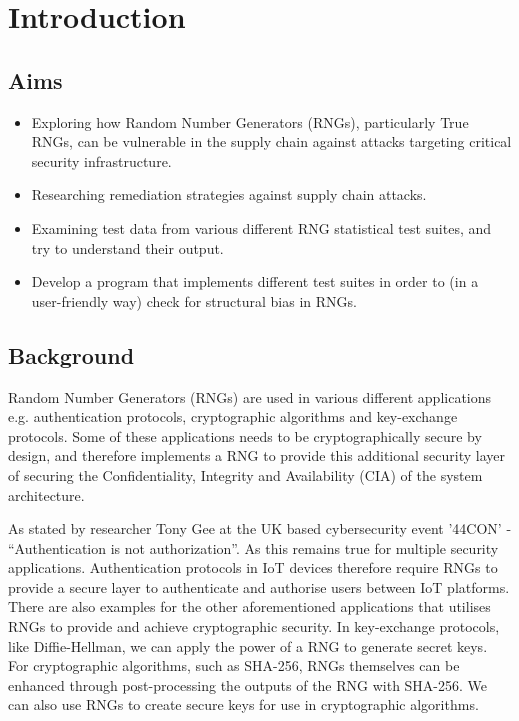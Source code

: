 \documentclass[]{final_report}
\begin{document}
\chapter*{Introduction}

\section*{Aims}
\begin{itemize}
	\item{Exploring how Random Number Generators (RNGs), particularly True RNGs, can be vulnerable in the supply chain against attacks targeting critical security infrastructure.}
	\item{Researching remediation strategies against supply chain attacks.}
	\item{Examining test data from various different RNG statistical test suites, and try to understand their output.}
	\item{Develop a program that implements different test suites in order to (in a user-friendly way) check for structural bias in RNGs.}
\end{itemize}

\section*{Background}

\par{Random Number Generators (RNGs) are used in various different applications e.g. authentication protocols, cryptographic algorithms and key-exchange protocols. Some of these applications needs to be cryptographically secure by design, and therefore implements a RNG to provide this additional security layer of securing the Confidentiality, Integrity and Availability (CIA) of the system architecture.}

\par{As stated by researcher Tony Gee at the UK based cybersecurity event '44CON' - ``Authentication is not authorization''\cite{Gee:2019}. As this remains true for multiple security applications. Authentication protocols in IoT devices therefore require RNGs to provide a secure layer to authenticate and authorise users between IoT platforms\cite{Cabuk:2017}. There are also examples for the other aforementioned applications that utilises RNGs to provide and achieve cryptographic security. In key-exchange protocols, like Diffie-Hellman, we can apply the power of a RNG to generate secret keys\cite{Mogos:2016}. For cryptographic algorithms, such as SHA-256, RNGs themselves can be enhanced through post-processing the outputs of the RNG with SHA-256\cite{Loza:2015}. We can also use RNGs to create secure keys for use in cryptographic algorithms.}
\end{document}
